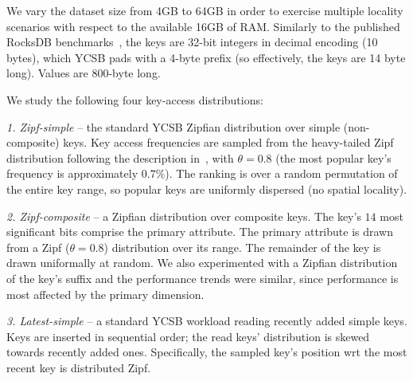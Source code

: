 We vary the dataset size from 4GB to 64GB in order to exercise multiple locality 
scenarios with respect to the available 16GB of RAM. Similarly to the published RocksDB benchmarks~\cite{RocksDBPerf}, 
the keys are 32-bit integers in decimal encoding (10 bytes), which YCSB pads with a 4-byte prefix (so effectively, 
the keys are 14 byte long). Values are 800-byte long. 

\noindent
We study the following four key-access distributions:  

\emph{1. Zipf-simple} -- the standard YCSB Zipfian distribution over simple (non-composite) keys. 
Key access frequencies are sampled from the heavy-tailed Zipf distribution 
following the description in~\cite{Gray:1994:QGB:191839.191886}, with $\theta = 0.8$
(the most popular key's frequency is approximately $0.7\%$). 
The ranking is over a random permutation of the entire key range, so popular keys are uniformly dispersed (no spatial locality).

\emph{2. Zipf-composite} -- a Zipfian distribution over composite keys. 
The key's $14$ most significant bits comprise the primary attribute. 
The primary attribute is drawn from a Zipf ($\theta=0.8$) distribution over its range. The remainder of the key is drawn uniformally at random.
We also experimented with a Zipfian distribution of the key's suffix and 
the performance trends were similar, since performance is most affected by  the primary dimension.

\emph{3. Latest-simple} -- a standard YCSB workload  reading  recently added simple keys.
Keys are inserted in sequential  order; the read keys' distribution is skewed towards recently added ones. 
Specifically, the sampled key's position wrt the most recent key is distributed Zipf. 

